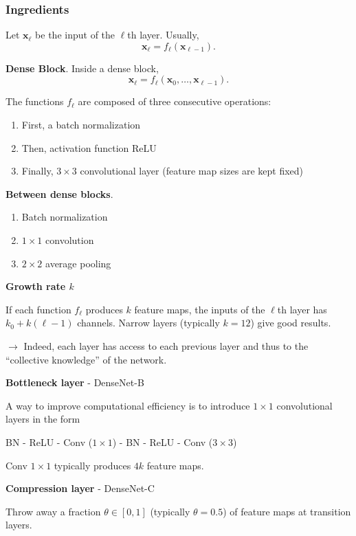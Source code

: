 \begin{frame}[allowframebreaks]
	\frametitle{Ingredients}



	Let $\textbf{x}_{\ell}$ be the input of the $\ell$th layer. Usually,
	$$
	\textbf{x}_{\ell} = f_{\ell}(\textbf{x}_{\ell-1}).
	$$

\bigskip

\textbf{Dense Block}. Inside a dense block,
	$$
	\textbf{x}_{\ell} = f_{\ell}(\textbf{x}_{0}, \hdots, \textbf{x}_{\ell-1}).
	$$

	The functions $f_{\ell}$ are composed of three consecutive operations:
	\begin{enumerate}
		\item First, a batch normalization
		\item Then, activation function ReLU
		\item Finally, $3 \times 3$ convolutional layer (feature map sizes are kept fixed)
	\end{enumerate}

\bigskip

\textbf{Between dense blocks}.
	\begin{enumerate}
		\item Batch normalization
		\item $1 \times 1$ convolution
		\item $2 \times 2$ average pooling
	\end{enumerate}

\framebreak

\textbf{Growth rate $k$}

If each function $f_{\ell}$ produces $k$ feature maps, the inputs of the $\ell$th layer has $k_0 + k(\ell-1)$ channels. Narrow layers (typically $k=12$) give good results.

$\rightarrow$ Indeed, each layer has access to each previous layer and thus to the ``collective knowledge'' of the network.

\bigskip

\textbf{Bottleneck layer} - DenseNet-B

A way to improve computational efficiency is to introduce $1 \times 1$ convolutional layers in the form
\begin{center}
	BN - ReLU - Conv ($1 \times 1$) - BN - ReLU - Conv ($3 \times 3$)
\end{center}
Conv  $1 \times 1$ typically produces $4k$ feature maps.

\bigskip

\textbf{Compression layer} - DenseNet-C

Throw away a fraction $\theta \in [0,1]$ (typically $\theta=0.5$) of feature maps at transition layers.
\end{frame}










